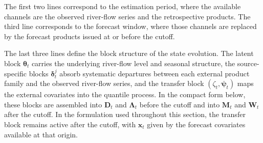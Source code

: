 \documentclass[APA,STIX1COL]{WileyNJD-v2}
\begin{document}
The first two lines correspond to the estimation period, where the available channels are the observed river-flow series and the retrospective products. The third line corresponds to the forecast window, where those channels are replaced by the forecast products issued at or before the cutoff.

The last three lines define the block structure of the state evolution. The latent block \(\boldsymbol{\theta}_t\) carries the underlying river-flow level and seasonal structure, the source-specific blocks \(\boldsymbol{\delta}_t^j\) absorb systematic departures between each external product family and the observed river-flow series, and the transfer block \((\zeta_t,\boldsymbol{\psi}_t)\) maps the external covariates into the quantile process. In the compact form below, these blocks are assembled into \(\boldsymbol{D}_t\) and \(\boldsymbol{\Lambda}_t\) before the cutoff and into \(\boldsymbol{M}_t\) and \(\mathbf{W}_t\) after the cutoff. In the formulation used throughout this section, the transfer block remains active after the cutoff, with \(\mathbf{x}_t\) given by the forecast covariates available at that origin.
\end{document}

